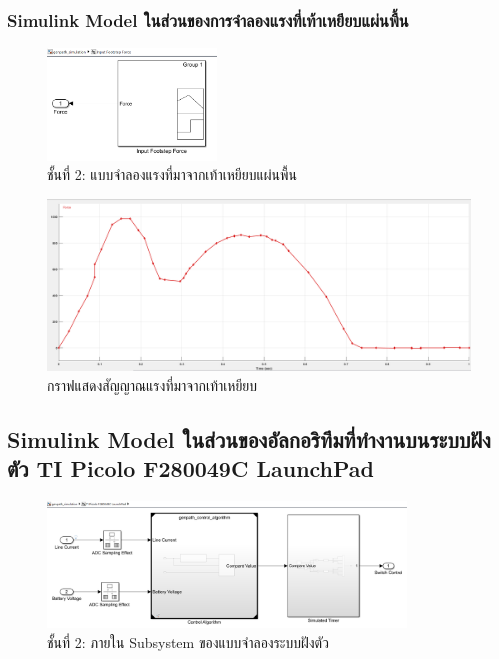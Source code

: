 \documentclass[11pt,a4paper]{article}
\begin{document}
\subsubsection{Simulink Model ในส่วนของการจำลองแรงที่เท้าเหยียบแผ่นพื้น}

\begin{figure}[H]
    \centering
    \includegraphics[width=0.4\textwidth]{l2-footstep-force.png}
    \caption{ชั้นที่ 2: แบบจำลองแรงที่มาจากเท้าเหยียบแผ่นพื้น}
\end{figure}

\begin{figure}[H]
    \centering
    \includegraphics[width=\textwidth]{footstepsignal.png}
    \caption{กราฟแสดงสัญญาณแรงที่มาจากเท้าเหยียบ}
\end{figure}

\subsection{Simulink Model ในส่วนของอัลกอริทึมที่ทำงานบนระบบฝังตัว TI Picolo F280049C LaunchPad}

\begin{figure}[H]
    \centering
    \includegraphics[width=0.85\textwidth]{l2-embed.png}
    \caption{ชั้นที่ 2: ภายใน Subsystem ของแบบจำลองระบบฝังตัว}
\end{figure}
\end{document}
